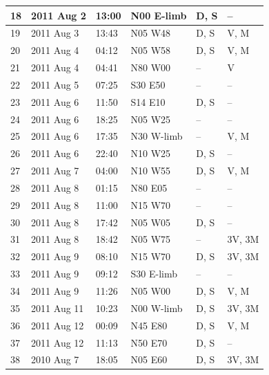 \begin{singlespace}
\begin{table}[H]
\begin{center}
\begin{tabular}{|l|l|l|l|p{2.0cm}|p{2.0cm}|}
	18 & 2011 Aug 2 & 13:00 & N00 E-limb & D, S & -- \\ \hline
	19 & 2011 Aug 3 & 13:43 & N05 W48 & D, S & V, M \\ \hline
	20 & 2011 Aug 4 & 04:12 & N05 W58 & D, S & V, M \\ \hline
	21 & 2011 Aug 4 & 04:41 & N80 W00 & -- & V \\ \hline
	22 & 2011 Aug 5 & 07:25 & S30 E50 & -- & -- \\ \hline
	23 & 2011 Aug 6 & 11:50 & S14 E10 & D, S & -- \\ \hline
	24 & 2011 Aug 6 & 18:25 & N05 W25 & -- & -- \\ \hline
	25 & 2011 Aug 6 & 17:35 & N30 W-limb & -- & V, M \\ \hline
	26 & 2011 Aug 6 & 22:40 & N10 W25 & D, S & -- \\ \hline
	27 & 2011 Aug 7 & 04:00 & N10 W55 & D, S & V, M \\ \hline
	28 & 2011 Aug 8 & 01:15 & N80 E05 & -- & -- \\ \hline
	29 & 2011 Aug 8 & 11:00 & N15 W70 & -- & -- \\ \hline
	30 & 2011 Aug 8 & 17:42 & N05 W05 & D, S & -- \\ \hline
	31 & 2011 Aug 8 & 18:42 & N05 W75 & -- & 3V, 3M \\ \hline
	32 & 2011 Aug 9 & 08:10 & N15 W70 & D, S & 3V, 3M \\ \hline
	33 & 2011 Aug 9 & 09:12 & S30 E-limb & -- & -- \\ \hline
	34 & 2011 Aug 9 & 11:26 & N05 W00 & D, S & V, M \\ \hline
	35 & 2011 Aug 11 & 10:23 & N00 W-limb & D, S & 3V, 3M \\ \hline
	36 & 2011 Aug 12 & 00:09 & N45 E80 & D, S & V, M \\ \hline
	37 & 2011 Aug 12 & 11:13 & N50 E70 & D, S & -- \\ \hline
	38 & 2010 Aug 7 & 18:05 & N05 E60 & D, S & 3V, 3M \\ \hline
	\end{tabular}
    \\ \rule{0mm}{5mm}
    \end{center}
    \label{tab:eventlist}
\end{table}
\end{singlespace}


